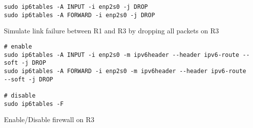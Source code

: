 \begin{listing}
\begin{verbatim}
sudo ip6tables -A INPUT -i enp2s0 -j DROP
sudo ip6tables -A FORWARD -i enp2s0 -j DROP
\end{verbatim}
\caption{Simulate link failure between R1 and R3 by dropping all packets on R3}
\label{lst:r3_link_failure}
\end{listing}


\begin{listing}
\begin{verbatim}
# enable
sudo ip6tables -A INPUT -i enp2s0 -m ipv6header --header ipv6-route --soft -j DROP
sudo ip6tables -A FORWARD -i enp2s0 -m ipv6header --header ipv6-route --soft -j DROP

# disable
sudo ip6tables -F
\end{verbatim}
\caption{Enable/Disable firewall on R3}
\label{lst:r3_fw}
\end{listing}

